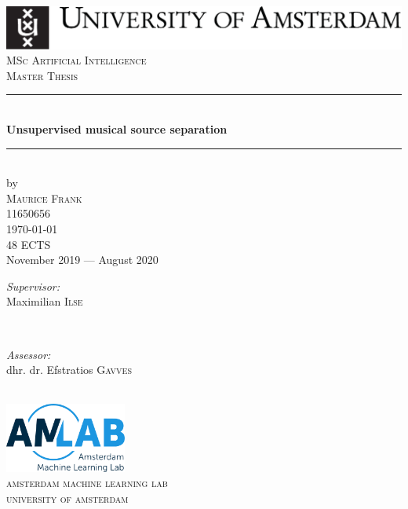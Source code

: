 \begin{titlepage}
\begin{fullwidth}
\newcommand{\HRule}{\rule{\linewidth}{0.5mm}} %

\center %
\includegraphics[width=0.8\linewidth]{../data/images/uva_logo}\\[2.5cm]

\textsc{\Large MSc Artificial Intelligence}\\[0.2cm]
\textsc{\Large Master Thesis}\\[0.5cm]

\HRule \\[0.4cm]
{\huge \bfseries Unsupervised musical source separation}\\[0.4cm] %
\HRule \\[0.5cm]


by\\[0.2cm]
\textsc{\Large Maurice Frank}\\[0.2cm]
11650656\\[1cm]

{\Large \today}\\[1cm]
48 ECTS\\ %

November 2019 --- August 2020\\[1cm]%

\begin{minipage}[t]{0.5\textwidth}
\begin{flushleft} \large
\emph{Supervisor:} \\
Maximilian \textsc{Ilse}
\end{flushleft}
\end{minipage}
~
\begin{minipage}[t]{0.5\textwidth}
\begin{flushright} \large
\emph{Assessor:} \\
dhr. dr. Efstratios \textsc{Gavves}\\
\end{flushright}
\end{minipage}\\[2cm]


\includegraphics[width=4cm]{../data/images/amlab.eps}\\[1cm]
\textsc{\large amsterdam machine learning lab\\university of amsterdam}\\[1.0cm] %
\vfill %
\end{fullwidth}
\end{titlepage}
